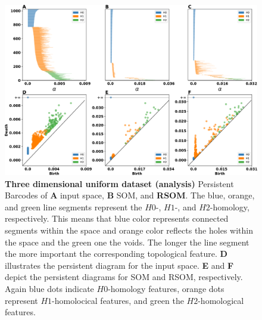 \begin{figure}
     \centering
     \includegraphics[width=\textwidth]{figures/experiment-3D-uniform-analysis.pdf}
     \caption{ {\bfseries \sffamily Three dimensional uniform dataset (analysis)}
     Persistent Barcodes of \textbf{A} input space, \textbf{B} SOM, and \textbf{RSOM}.
  The blue, orange, and green line segments represent the $H0$-, $H1$-, and $H2$-homology, respectively.
  This means that blue color represents connected segments within the space and orange color reflects the holes
  within the space and the green one the voids. The longer the line segment the more important the 
  corresponding topological feature. \textbf{D} illustrates the persistent diagram for the input space.
  \textbf{E} and \textbf{F} depict the persistent diagrams for SOM and RSOM, respectively. Again blue dots
  indicate $H0$-homology features, orange dots represent $H1$-homolocical features, and green the 
  $H2$-homological features.}
 \label{fig:3D-uniform:analysis}
\end{figure}
